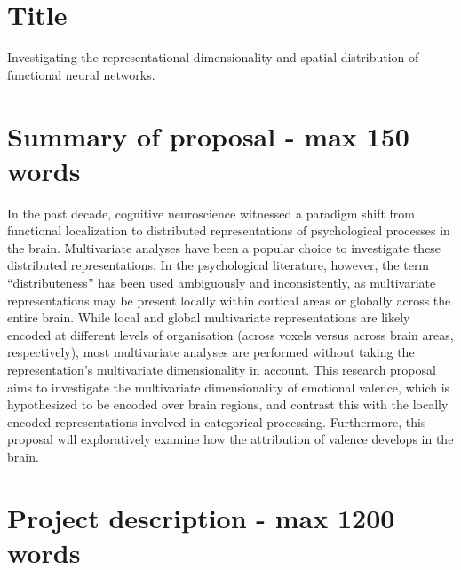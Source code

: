 \documentclass[12pt,a4paper]{article}\usepackage[]{graphicx}\usepackage[]{color}
\begin{document}
\section{Title}
Investigating the representational dimensionality and spatial distribution of functional neural networks.

\section{Summary of proposal \textmd{- max 150 words}}
In the past decade, cognitive neuroscience witnessed a paradigm shift from functional localization to distributed representations of psychological processes in the brain. Multivariate analyses have been a popular choice to investigate these distributed representations. In the psychological literature, however, the term ``distributeness'' has been used ambiguously and inconsistently, as multivariate representations may be present locally within cortical areas or globally across the entire brain. While local and global multivariate representations are likely encoded at different levels of organisation (across voxels versus across brain areas, respectively), most multivariate analyses are performed without taking the representation's multivariate dimensionality in account. This research proposal aims to investigate the multivariate dimensionality of emotional valence, which is hypothesized to be encoded over brain regions, and contrast this with the locally encoded representations involved in categorical processing. Furthermore, this proposal will exploratively examine how the attribution of valence develops in the brain. \\

\noindent
\wordcount

\section{Project description \textmd{- max 1200 words}}
\end{document}
